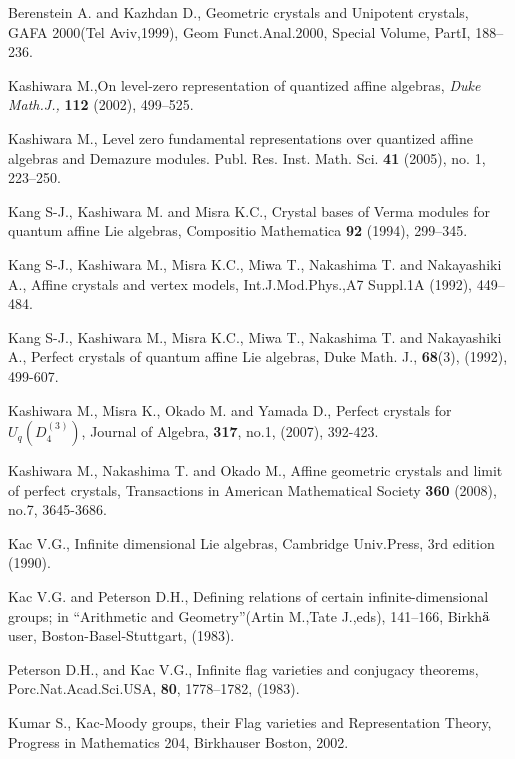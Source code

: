 
\begin{thebibliography}{A}

 Berenstein A. and Kazhdan D., 
Geometric crystals and
Unipotent crystals, 
GAFA 2000(Tel Aviv,1999), Geom Funct.Anal.2000, 
Special Volume, PartI, 188--236.

 Kashiwara M.,On level-zero
representation of quantized affine algebras, 
{\sl Duke Math.J.,} {\bf 112} (2002), 499--525.

 Kashiwara M., 
Level zero fundamental representations 
over quantized affine algebras and 
Demazure modules. Publ. Res. Inst. Math. Sci. {\bf 41}
(2005), no. 1, 223--250.

 Kang S-J., Kashiwara M. and Misra K.C.,
Crystal bases of Verma modules for quantum affine Lie 
algebras, 
Compositio Mathematica {\bf 92} (1994), 299--345.

 Kang S-J., Kashiwara M., Misra K.C.,
Miwa T., Nakashima T. and Nakayashiki A., 
Affine crystals and vertex models, 
Int.J.Mod.Phys.,A7 Suppl.1A (1992), 449--484.

 Kang S-J., Kashiwara M., Misra K.C.,
Miwa T., Nakashima T. and Nakayashiki A., 
Perfect crystals of quantum affine Lie algebras, 
Duke Math. J.,
{\bf 68}(3), (1992), 499-607.

 Kashiwara M., Misra K., Okado M. and Yamada D.,
Perfect crystals for $U_q({D^{(3)}_{4}})$, 
Journal of Algebra, {\bf 317}, no.1, (2007), 392-423.

 Kashiwara M., Nakashima T. and Okado M.,
Affine geometric crystals and limit of perfect 
crystals, Transactions in American Mathematical Society 
{\bf 360} (2008), no.7,
3645-3686.

 Kac V.G., 
Infinite dimensional Lie algebras, 
Cambridge Univ.Press, 3rd edition (1990).

 Kac V.G. and Peterson D.H., 
Defining relations of 
certain infinite-dimensional groups; 
in ``Arithmetic and Geometry''(Artin M.,Tate J.,eds), 
141--166,
Birkh$\ddot{\rm a}$user, Boston-Basel-Stuttgart, (1983).

 Peterson D.H., and Kac V.G., 
Infinite flag varieties
and conjugacy theorems, Porc.Nat.Acad.Sci.USA, 
{\bf 80}, 1778--1782, (1983).

 Kumar S., Kac-Moody groups, 
their Flag varieties
and Representation Theory, Progress in Mathematics 204, 
Birkhauser Boston, 2002.


\end{thebibliography}
